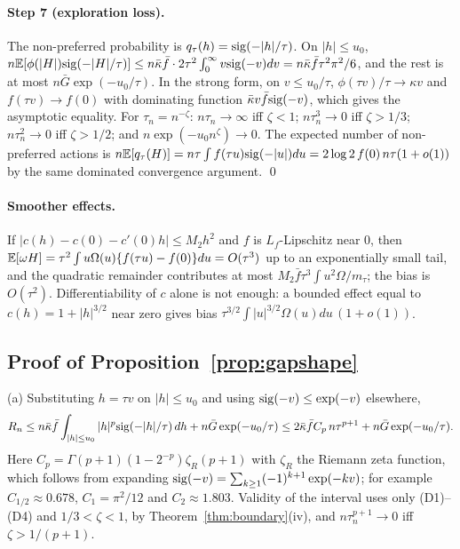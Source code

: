 \paragraph{Step 7 (exploration loss).} The non-preferred probability is
$q_\tau(h)=\mathrm{sig}(-|h|/\tau)$. On $|h|\le u_0$,
$n\mathbb{E}[\phi(|H|)\mathrm{sig}(-|H|/\tau)]\le n\bar\kappa\bar f\cdot2\tau^2\int_0^\infty
v\mathrm{sig}(-v)dv=n\bar\kappa\bar f\tau^2\pi^2/6$, and the rest is at most
$n\bar G\exp(-u_0/\tau)$. In the strong form, on $v\le u_0/\tau$,
$\phi(\tau v)/\tau\to\kappa v$ and $f(\tau v)\to f(0)$ with dominating function
$\bar\kappa v\bar f\mathrm{sig}(-v)$, which gives the asymptotic equality. For
$\tau_n=n^{-\zeta}$: $n\tau_n\to\infty$ iff $\zeta<1$; $n\tau_n^3\to0$ iff
$\zeta>1/3$; $n\tau_n^2\to0$ iff $\zeta>1/2$; and $n\exp(-u_0n^\zeta)\to0$.
The expected number of non-preferred actions is
$n\mathbb{E}[q_\tau(H)]=n\tau\int f(\tau u)\mathrm{sig}(-|u|)du=2\log2\,f(0)\,n\tau(1+o(1))$ by the
same dominated convergence argument. \qed

\paragraph{Smoother effects.} If $|c(h)-c(0)-c'(0)h|\le M_2h^2$ and $f$ is
$L_f$-Lipschitz near $0$, then
$\mathbb{E}[\omega H]=\tau^2\int u\Omega(u)\{f(\tau u)-f(0)\}du=O(\tau^3)$ up to an
exponentially small tail, and the quadratic remainder contributes at most
$M_2\bar f\tau^3\int u^2\Omega/m_\tau$; the bias is $O(\tau^2)$. Differentiability of
$c$ alone is not enough: a bounded effect equal to $c(h)=1+|h|^{3/2}$
near zero gives bias
$\tau^{3/2}\int|u|^{3/2}\Omega(u)du\,(1+o(1))$.

\subsection{Proof of Proposition~\ref{prop:gapshape}}

(a) Substituting $h=\tau v$ on $|h|\le u_0$ and using $\mathrm{sig}(-v)\le\exp(-v)$ elsewhere,
\[
R_n\le n\bar\kappa\bar f\int_{|h|\le u_0}|h|^p\mathrm{sig}(-|h|/\tau)\,dh+n\bar G\exp(-u_0/\tau)
\le2\bar\kappa\bar fC_p\,n\tau^{p+1}+n\bar G\exp(-u_0/\tau).
\]
Here $C_p=\Gamma(p+1)(1-2^{-p})\zeta_R(p+1)$ with $\zeta_R$ the Riemann zeta function,
which follows from expanding $\mathrm{sig}(-v)=\sum_{k\ge1}(-1)^{k+1}\exp(-kv)$; for example
$C_{1/2}\approx0.678$, $C_1=\pi^2/12$ and $C_2\approx1.803$. Validity of the interval
uses only (D1)--(D4) and $1/3<\zeta<1$, by Theorem~\ref{thm:boundary}(iv), and
$n\tau_n^{p+1}\to0$ iff $\zeta>1/(p+1)$.


